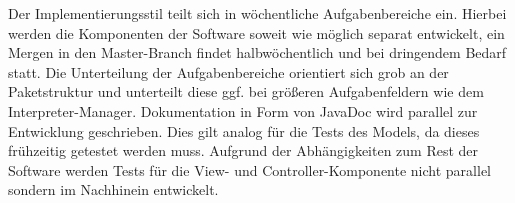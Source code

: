 \documentclass[parskip=full,11pt,twoside]{scrartcl}
\begin{document}
\begin{ganttchart}[x unit = 1.4cm, y unit chart = 0.95cm]{0}{4}
	
	

\end{ganttchart}
\newpage
Der Implementierungsstil teilt sich in wöchentliche Aufgabenbereiche ein. Hierbei werden die Komponenten der Software soweit wie möglich separat entwickelt, ein Mergen in den Master-Branch findet halbwöchentlich und bei dringendem Bedarf statt. Die Unterteilung der Aufgabenbereiche orientiert sich grob an der Paketstruktur und unterteilt diese ggf. bei größeren Aufgabenfeldern wie dem Interpreter-Manager. Dokumentation in Form von JavaDoc wird parallel zur Entwicklung geschrieben. Dies gilt analog für die Tests des Models, da dieses frühzeitig getestet werden muss. Aufgrund der Abhängigkeiten zum Rest der Software werden Tests für die View- und Controller-Komponente nicht parallel sondern im Nachhinein entwickelt.
\end{document}
